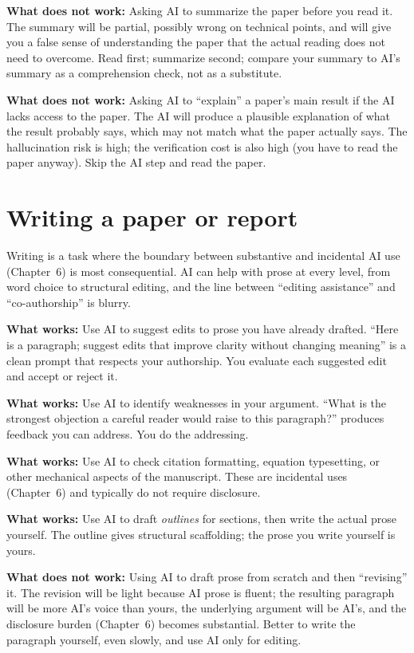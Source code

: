 \documentclass[11pt]{book}
\begin{document}
\textbf{What does not work:} Asking AI to summarize the paper before you read it. The summary will be partial, possibly wrong on technical points, and will give you a false sense of understanding the paper that the actual reading does not need to overcome. Read first; summarize second; compare your summary to AI's summary as a comprehension check, not as a substitute.

\textbf{What does not work:} Asking AI to ``explain'' a paper's main result if the AI lacks access to the paper. The AI will produce a plausible explanation of what the result probably says, which may not match what the paper actually says. The hallucination risk is high; the verification cost is also high (you have to read the paper anyway). Skip the AI step and read the paper.

\section{Writing a paper or report}

Writing is a task where the boundary between substantive and incidental AI use (Chapter~6) is most consequential. AI can help with prose at every level, from word choice to structural editing, and the line between ``editing assistance'' and ``co-authorship'' is blurry.

\textbf{What works:} Use AI to suggest edits to prose you have already drafted. ``Here is a paragraph; suggest edits that improve clarity without changing meaning'' is a clean prompt that respects your authorship. You evaluate each suggested edit and accept or reject it.

\textbf{What works:} Use AI to identify weaknesses in your argument. ``What is the strongest objection a careful reader would raise to this paragraph?'' produces feedback you can address. You do the addressing.

\textbf{What works:} Use AI to check citation formatting, equation typesetting, or other mechanical aspects of the manuscript. These are incidental uses (Chapter~6) and typically do not require disclosure.

\textbf{What works:} Use AI to draft \emph{outlines} for sections, then write the actual prose yourself. The outline gives structural scaffolding; the prose you write yourself is yours.

\textbf{What does not work:} Using AI to draft prose from scratch and then ``revising'' it. The revision will be light because AI prose is fluent; the resulting paragraph will be more AI's voice than yours, the underlying argument will be AI's, and the disclosure burden (Chapter~6) becomes substantial. Better to write the paragraph yourself, even slowly, and use AI only for editing.
\end{document}
